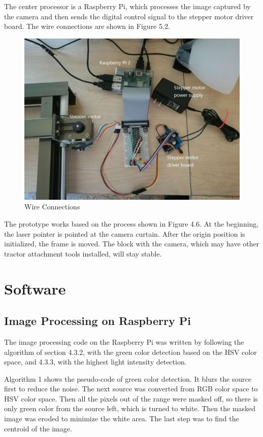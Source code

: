 \documentclass[letterpaper,12pt,oneside]{book}
\begin{document}
		The center processor is a Raspberry Pi, which processes the image captured by the camera and then sends the digital control signal to the stepper motor driver board. The wire connections are shown in Figure 5.2.
		\begin{figure}[ht!]
			\begin{center}
				\includegraphics[scale = 0.4]{connection.jpg}
				\caption{Wire Connections}
			\end{center}
		\end{figure}
		The prototype works based on the process shown in Figure 4.6. At the beginning, the laser pointer is pointed at the camera curtain. After the origin position is initialized, the frame is moved. The block with the camera, which may have other tractor attachment tools installed, will stay stable.
		
		\section{Software}
		
		\subsection{Image Processing on Raspberry Pi}
		The image processing code on the Raspberry Pi was written by following the algorithm of section 4.3.2, with the green color detection based on the HSV color space, and 4.3.3, with the highest light intensity detection. 
		
		Algorithm 1 shows the pseudo-code of green color detection. It blurs the source first to reduce the noise. The next source was converted from RGB color space to HSV color space. Then all the pixels out of the range were masked off, so there is only green color from the source left, which is turned to white. Then the masked image was eroded to minimize the white area. The last step was to find the centroid of the image.
		
\end{document}
